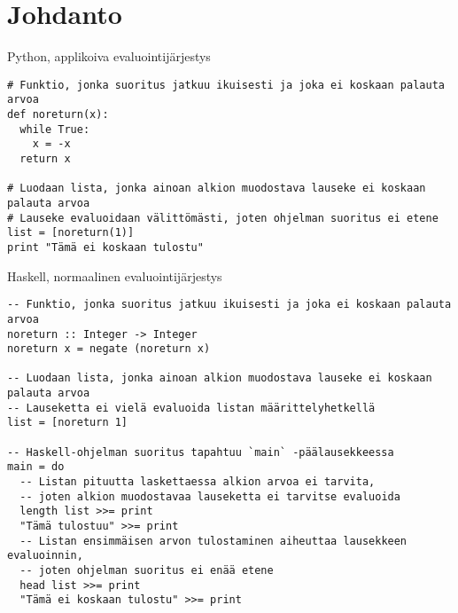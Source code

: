 
\section{Johdanto}



\begin{listing}[H]
    \caption{Python, applikoiva evaluointijärjestys}
  \bigskip
  \begin{verbatim}
# Funktio, jonka suoritus jatkuu ikuisesti ja joka ei koskaan palauta arvoa
def noreturn(x):
  while True:
    x = -x
  return x

# Luodaan lista, jonka ainoan alkion muodostava lauseke ei koskaan palauta arvoa
# Lauseke evaluoidaan välittömästi, joten ohjelman suoritus ei etene
list = [noreturn(1)]
print "Tämä ei koskaan tulostu"
\end{verbatim}
\end{listing}


\begin{listing}[H]
  \caption{Haskell, normaalinen evaluointijärjestys}
  \bigskip
  \begin{verbatim}
-- Funktio, jonka suoritus jatkuu ikuisesti ja joka ei koskaan palauta arvoa
noreturn :: Integer -> Integer
noreturn x = negate (noreturn x)

-- Luodaan lista, jonka ainoan alkion muodostava lauseke ei koskaan palauta arvoa
-- Lauseketta ei vielä evaluoida listan määrittelyhetkellä
list = [noreturn 1]

-- Haskell-ohjelman suoritus tapahtuu `main` -päälausekkeessa
main = do
  -- Listan pituutta laskettaessa alkion arvoa ei tarvita,
  -- joten alkion muodostavaa lauseketta ei tarvitse evaluoida
  length list >>= print
  "Tämä tulostuu" >>= print
  -- Listan ensimmäisen arvon tulostaminen aiheuttaa lausekkeen evaluoinnin,
  -- joten ohjelman suoritus ei enää etene
  head list >>= print
  "Tämä ei koskaan tulostu" >>= print

\end{verbatim}
\end{listing}

